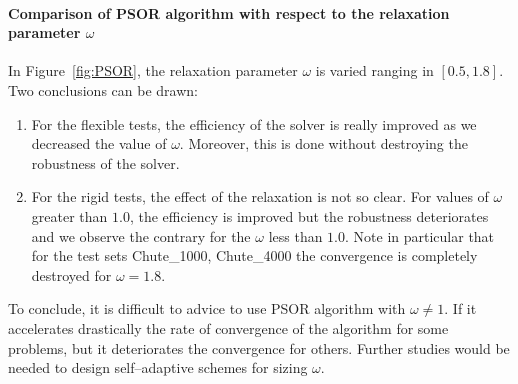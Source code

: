 \paragraph{Comparison of {\sf PSOR}  algorithm with respect to  the relaxation parameter $\omega$}

In Figure~\ref{fig:PSOR},  the relaxation parameter $\omega$ is varied ranging in $[0.5,1.8]$.  Two conclusions can be drawn:
\begin{enumerate}
\item For the flexible tests, the efficiency of the solver is really improved as we decreased the value of $\omega$. Moreover, this is done without destroying the robustness of the solver.
\item For the rigid tests, the effect of the relaxation is not so clear. For values of $\omega$ greater than $1.0$, the efficiency is improved but the robustness deteriorates and we observe the contrary for the  $\omega$  less than $1.0$. Note in particular that for the test sets Chute\_1000, Chute\_4000 the convergence is completely destroyed for $\omega = 1.8$.
\end{enumerate}
To conclude, it is difficult to advice to use PSOR algorithm with $\omega\neq 1$. If it accelerates drastically the rate of convergence of the algorithm for some problems, but it deteriorates the convergence for others. Further studies would be needed to design self--adaptive schemes for sizing $\omega$.

